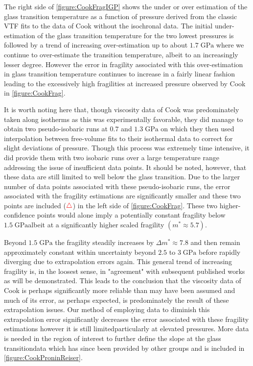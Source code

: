 The right side of \fig \nolinebreak \ref{figure:CookFragIGP} shows the under or over estimation of the glass transition temperature as a function of pressure derived from the classic VTF fits to the data of Cook \etal without the \tgp isochronal data. The initial under-estimation of the glass transition temperature for the two lowest pressures is followed by a trend of increasing over-estimation up to about $1.7\;\si{\giga\pascal}$ where we continue to over-estimate the transition temperature, albeit to an increasingly lesser degree.  However the error in fragility associated with this over-estimation in glass transition temperature continues to increase in a fairly linear fashion leading to the excessively high fragilities at increased pressure observed by Cook \etal in \fig \nolinebreak \ref{figure:CookFrag}.

It is worth noting here that, though viscosity data of Cook \etal was predominately taken along isotherms as this was experimentally favorable, they did manage to obtain two pseudo-isobaric runs at $0.7$ and $1.3\;\si{\giga\pascal}$ on which they then used interpolation between free-volume fits to their isothermal data to correct for slight deviations of pressure.  Though this process was extremely time intensive, it did provide them with two isobaric runs over a large temperature range addressing the issue of insufficient data points.  It should be noted, however, that these data are still limited to well below the glass transition.  Due to the larger number of data points associated with these pseudo-isobaric runs, the error associated with the fragility estimations are significantly smaller and these two points are included ($\color{red}\triangle$) in the left side of \fig \nolinebreak \ref{figure:CookFrag}.  These two higher-confidence points would alone imply a potentially constant fragility below $1.5\;\si{\giga\pascal}$\textemdash albeit at a significantly higher scaled fragility $(m^*\approx 5.7)$.  

Beyond $1.5\;\si{\giga\pascal}$ the fragility steadily increases by $\Delta m^*\approx 7.8$ and then remain approximately constant within uncertainty beyond $2.5$ to $3\;\si{\giga\pascal}$ before rapidly diverging due to extrapolation errors again.  This general trend of increasing fragility is, in the loosest sense, in "agreement" with subsequent published works as will be demonstrated.  This leads to the conclusion that the viscosity data of Cook \etal is perhaps significantly more reliable than may have been assumed and much of its error, as perhaps expected, is predominately the result of these extrapolation issues. Our method of employing \tgp data to diminish this extrapolation error significantly decreases the error associated with these fragility estimations however it is still limited\textemdash particularly at elevated pressures.  More data is needed in the region of interest to further define the slope at the glass transition\textemdash data which has since been provided by other groups and is included in \fig \ref{figure:CookProninReiser}.    

